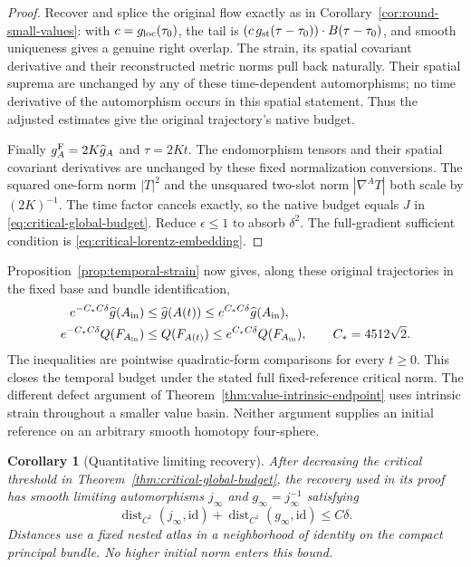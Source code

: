 \documentclass[11pt]{article}
\numberwithin{equation}{section}
\newtheorem{corollary}[theorem]{Corollary}
\theoremstyle{definition}
\theoremstyle{remark}
\begin{document}
\begin{proof}
Recover and splice the original flow exactly as in
Corollary~\ref{cor:round-small-values}: with
$c=g_{\rm loc}(\tau_0)$, the tail is
$(c\,g_{\rm st}(\tau-\tau_0))\cdot B(\tau-\tau_0)$,
and smooth uniqueness gives a genuine right overlap.
The strain, its spatial covariant derivative and
their reconstructed metric norms pull back naturally.
Their spatial suprema are unchanged by any of these
time-dependent automorphisms; no time derivative of
the automorphism occurs in this spatial statement.
Thus the adjusted estimates give the original
trajectory's native budget.

Finally $g_A^{\rm F}=2K\widehat g_A$ and
$\tau=2Kt$. The endomorphism tensors and their spatial
covariant derivatives are unchanged by these fixed
normalization conversions. The squared one-form norm $|T|^2$ and
the unsquared two-slot norm $|\nabla^AT|$ both scale
by $(2K)^{-1}$. The time factor cancels exactly,
so the native budget equals $J$ in
\eqref{eq:critical-global-budget}. Reduce
$\epsilon\le1$ to absorb $\delta^2$.
The full-gradient sufficient condition is
\eqref{eq:critical-lorentz-embedding}.
\end{proof}

Proposition~\ref{prop:temporal-strain} now gives, along
these original trajectories in the fixed base and
bundle identification,
\begin{align*}
 e^{-C_*C\delta}\widehat g(A_{\rm in})
 &\le\widehat g(A(t))\le e^{C_*C\delta}\widehat g(A_{\rm in}),\\
 e^{-C_*C\delta}Q(F_{A_{\rm in}})
 &\le Q(F_{A(t)})\le e^{C_*C\delta}Q(F_{A_{\rm in}}),
 \qquad C_*=4512\sqrt2 .
\end{align*}
The inequalities are pointwise quadratic-form
comparisons for every $t\ge0$.
This closes the temporal budget under the stated
full fixed-reference critical norm. The different
defect argument of Theorem~\ref{thm:value-intrinsic-endpoint}
uses intrinsic strain throughout a smaller value basin.
Neither argument supplies an initial reference on an
arbitrary smooth homotopy four-sphere.

\begin{corollary}[Quantitative limiting recovery]
\label{cor:critical-recovery-limit}
After decreasing the critical threshold in
Theorem~\ref{thm:critical-global-budget}, the recovery
used in its proof has smooth limiting automorphisms
$j_\infty$ and $g_\infty=j_\infty^{-1}$ satisfying
\[
 \operatorname{dist}_{C^1}(j_\infty,\mathrm{id})
 +\operatorname{dist}_{C^1}(g_\infty,\mathrm{id})
 \le C\delta .
\]
Distances use a fixed nested atlas in a neighborhood
of identity on the compact principal bundle.
No higher initial norm enters this bound.
\end{corollary}
\end{document}
